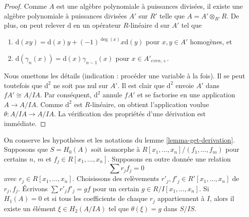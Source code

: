 \begin{proof}
Comme $A$ est une algèbre polynomiale à puissances divisées, il existe une
algèbre polynomiale à puissances divisées $A'$ sur $R'$ telle que
$A = A' \otimes_{R'} R$.
De plus, on peut relever $\text{d}$ en un opérateur
$R$-linéaire $\text{d}$ sur $A'$ tel que
\begin{enumerate}
\item  $\text{d}(xy) = \text{d}(x)y + (-1)^{\deg(x)}x \text{d}(y)$
pour $x, y \in A'$ homogènes, et
\item  $\text{d}(\gamma_n(x)) = \text{d}(x) \gamma_{n - 1}(x)$ pour
$x \in A'_{even, +}$.
\end{enumerate}
Nous omettons les détails (indication : procéder une variable à la fois).
Il se peut toutefois que $\text{d}^2$
ne soit pas nul sur $A'$. Il est clair que $\text{d}^2$ envoie $A'$ dans
$fA' \cong A/IA$. Par conséquent, $\text{d}^2$ annule $fA'$ et se factorise
en une application $A \to A/IA$. Comme $\text{d}^2$ est $R$-linéaire, on
obtient l'application voulue $\theta : A/IA \to A/IA$. La vérification des
propriétés d'une dérivation est immédiate.
\end{proof}

\begin{lemma}
\label{lemma-compute-theta}
On conserve les hypothèses et les notations du lemme
\ref{lemma-get-derivation}.
Supposons que $S = H_0(A)$ soit isomorphe à
$R[x_1, \ldots, x_n]/(f_1, \ldots, f_m)$
pour certains $n$, $m$ et $f_j \in R[x_1, \ldots, x_n]$.
Supposons en outre donnée une relation
$$
\sum r_j f_j = 0
$$
avec $r_j \in R[x_1, \ldots, x_n]$.
Choisissons des relèvements $r'_j, f'_j \in R'[x_1, \ldots, x_n]$ de
$r_j, f_j$. Écrivons $\sum r'_j f'_j = gf$ pour un certain
$g \in R/I[x_1, \ldots, x_n]$.
Si $H_1(A) = 0$ et si tous les coefficients de chaque $r_j$ appartiennent
à $I$, alors il existe un élément $\xi \in H_2(A/IA)$ tel que
$\theta(\xi) = g$ dans $S/IS$.
\end{lemma}

